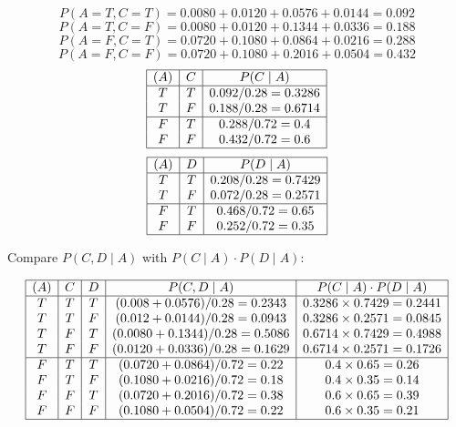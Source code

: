 \documentclass[12pt]{article}
\begin{document}
\begin{enumerate}[font=\Large,label=(\alph*)]
	      $$ P(A = T, C = T) = 0.0080 + 0.0120 + 0.0576 + 0.0144 = 0.092 $$
	      $$ P(A = T, C = F) = 0.0080 + 0.0120 + 0.1344 + 0.0336 = 0.188 $$
	      $$ P(A = F, C = T) = 0.0720 + 0.1080 + 0.0864 + 0.0216 = 0.288 $$
	      $$ P(A = F, C = F) = 0.0720 + 0.1080 + 0.2016 + 0.0504 = 0.432 $$
	      $$
		      \begin{array}{|c|c|c|}
			      \hline
			      (A) & C & P(C \mid A)       \\
			      \hline
			      T   & T & 0.092/0.28=0.3286 \\
			      T   & F & 0.188/0.28=0.6714 \\
			      \hline
			      F   & T & 0.288/0.72=0.4    \\
			      F   & F & 0.432/0.72=0.6    \\
			      \hline
		      \end{array}
	      $$
	      $$
		      \begin{array}{|c|c|c|}
			      \hline
			      (A) & D & P(D \mid A)       \\
			      \hline
			      T   & T & 0.208/0.28=0.7429 \\
			      T   & F & 0.072/0.28=0.2571 \\
			      \hline
			      F   & T & 0.468/0.72=0.65   \\
			      F   & F & 0.252/0.72=0.35   \\
			      \hline
		      \end{array}
	      $$

	      Compare $ P(C, D \mid A) $ with $ P(C \mid A) \cdot P(D \mid A) $:

	      $$
		      \begin{array}{|c|c|c|c|c|}
			      \hline
			      (A) & C & D & P(C, D \mid A)                & P(C \mid A) \cdot P(D \mid A) \\
			      \hline
			      T   & T & T & (0.008+0.0576)/0.28 = 0.2343  & 0.3286 \times 0.7429 = 0.2441 \\
			      T   & T & F & (0.012+0.0144)/0.28 = 0.0943  & 0.3286 \times 0.2571 = 0.0845 \\
			      T   & F & T & (0.0080+0.1344)/0.28 = 0.5086 & 0.6714 \times 0.7429 = 0.4988 \\
			      T   & F & F & (0.0120+0.0336)/0.28 = 0.1629 & 0.6714 \times 0.2571 = 0.1726 \\
			      \hline
			      F   & T & T & (0.0720+0.0864)/0.72 = 0.22   & 0.4 \times 0.65 = 0.26        \\
			      F   & T & F & (0.1080+0.0216)/0.72 = 0.18   & 0.4 \times 0.35 = 0.14        \\
			      F   & F & T & (0.0720+0.2016)/0.72 = 0.38   & 0.6 \times 0.65 = 0.39        \\
			      F   & F & F & (0.1080+0.0504)/0.72 = 0.22   & 0.6 \times 0.35 = 0.21        \\
			      \hline
		      \end{array}
	      $$


\end{enumerate}
\end{document}
